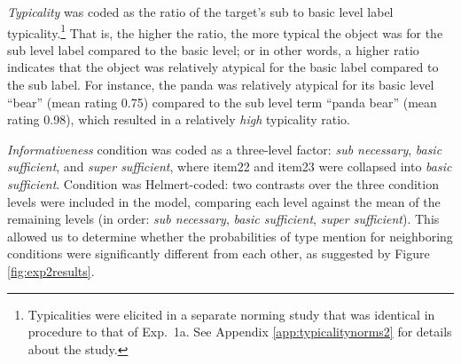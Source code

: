 \documentclass[11pt]{article}
\newcommand{\figref}[1]{Figure \ref{#1}}
\newcommand{\appref}[1]{Appendix \ref{#1}}
\begin{document}
\emph{Typicality} was coded as the ratio of the target's sub to basic level label typicality.\footnote{Typicalities were elicited in a separate norming study that was identical in procedure to that of Exp.~1a. See \appref{app:typicalitynorms2} for details about the study.} That is, the higher the ratio, the more typical the object was for the sub level label compared to the basic level; or in other words, a higher ratio indicates that the object was relatively atypical for the basic label compared to the sub label. For instance, the panda was relatively atypical for its basic level ``bear'' (mean rating 0.75) compared to the sub level term ``panda bear'' (mean rating 0.98), which resulted in a relatively \emph{high} typicality ratio.

\emph{Informativeness} condition was coded as a three-level factor: \emph{sub necessary}, \emph{basic sufficient}, and \emph{super sufficient}, where item22 and item23 were collapsed into \emph{basic sufficient}. Condition was Helmert-coded: two contrasts over the three condition levels were included in the model, comparing each level against the mean of the remaining levels (in order: \emph{sub necessary}, \emph{basic sufficient}, \emph{super sufficient}). This allowed us to determine whether the probabilities of type mention  for neighboring conditions were significantly different from each other, as suggested by \figref{fig:exp2results}.

%
\end{document}
